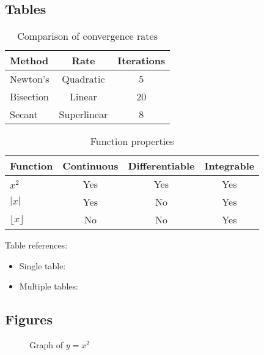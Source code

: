 \documentclass[11pt]{article}
\begin{document}
\subsection{Tables}

\begin{table}[htbp]
\centering
\caption{Comparison of convergence rates}
\label{tab:convergence}
\begin{tabular}{@{}lcc@{}}
\toprule
Method & Rate & Iterations \\
\midrule
Newton's & Quadratic & 5 \\
Bisection & Linear & 20 \\
Secant & Superlinear & 8 \\
\bottomrule
\end{tabular}
\end{table}

\begin{table}[htbp]
\centering
\caption{Function properties}
\label{tab:functions}
\begin{tabular}{@{}lccc@{}}
\toprule
Function & Continuous & Differentiable & Integrable \\
\midrule
$x^2$ & Yes & Yes & Yes \\
$|x|$ & Yes & No & Yes \\
$\lfloor x \rfloor$ & No & No & Yes \\
\bottomrule
\end{tabular}
\end{table}

Table references:
\begin{itemize}
\item Single table: 
\item Multiple tables: 
\end{itemize}

\subsection{Figures}

\begin{figure}[htbp]
\centering
{}
\caption{Graph of $y = x^2$}
\label{fig:parabola}
\end{figure}
\end{document}
